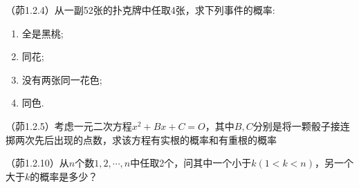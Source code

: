 \begin{problemset}[错题记录]
    \item （茆1.2.4）从一副52张的扑克牌中任取4张，求下列事件的概率:
    \begin{enumerate}
      \item 全是黑桃;
      \item 同花;
      \item 没有两张同一花色;
      \item 同色.
    \end{enumerate}
    \item （茆1.2.5）考虑一元二次方程$x^2+Bx+C=O$，其中$B,C$分别是将一颗骰子接连掷两次先后出现的点数，求该方程有实根的概率和有重根的概率
    \item （茆1.2.10）从$n$个数$1, 2, \cdots, n$中任取2个，问其中一个小于$k (1 < k < n)$，另一个大于$k$的概率是多少？
    
\end{problemset}